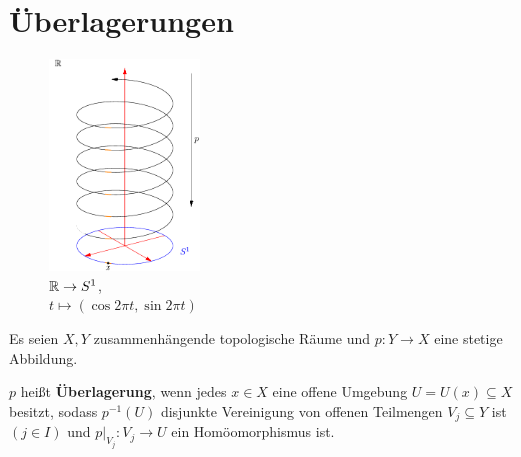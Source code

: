 \section{Überlagerungen}
\begin{figure}[htp]
    \centering
    \includegraphics[width=4cm, keepaspectratio]{figures/topology-r-spiral-covering-s.pdf}
    \caption{$\mathbb{R} \rightarrow S^1$,\\$t \mapsto (\cos 2 \pi t, \sin 2 \pi t)$}
    \label{fig:ueberlappung-r1-spirale-s1}
\end{figure}
\begin{definition}\label{def:12.1}%
    Es seien $X, Y$ zusammenhängende topologische Räume und
    $p: Y \rightarrow X$ eine stetige Abbildung.

    $p$ heißt \textbf{Überlagerung}, wenn jedes $x \in X$ eine offene
    Umgebung $U = U(x) \subseteq X$ besitzt, sodass $p^{-1}(U)$ disjunkte Vereinigung
    von offenen Teilmengen $V_j \subseteq Y$ ist $(j \in I)$ und
    $p|_{V_j}: V_j \rightarrow U$ ein Homöomorphismus ist.
\end{definition}

